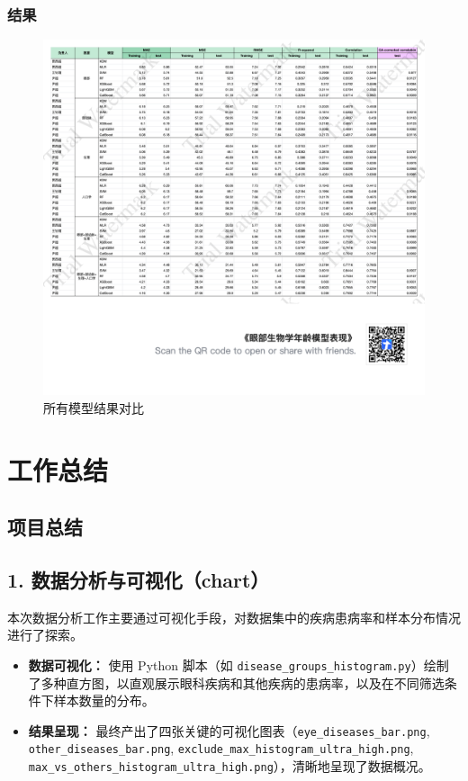 \documentclass[UTF8]{report}
\theoremstyle{MyLineTheoremStyle} %
\theoremstyle{MyBlockTheoremStyle} %
\theoremstyle{MySubsubsectionStyle} %
\begin{document}
\subsection*{结果}
\begin{figure}[H]
    \centering
    \includegraphics[width=1.0\textwidth]{assets/eye_table.png}
    \caption{所有模型结果对比}
    \label{fig:model_comparison}
\end{figure}

\chapter{工作总结}

\section{项目总结}
\section*{1. 数据分析与可视化（chart）}
本次数据分析工作主要通过可视化手段，对数据集中的疾病患病率和样本分布情况进行了探索。

\begin{itemize}
    \item \textbf{数据可视化：} 使用 Python 脚本（如 \texttt{disease\_groups\_histogram.py}）绘制了多种直方图，以直观展示眼科疾病和其他疾病的患病率，以及在不同筛选条件下样本数量的分布。
    \item \textbf{结果呈现：} 最终产出了四张关键的可视化图表（\texttt{eye\_diseases\_bar.png}, \texttt{other\_diseases\_bar.png}, \texttt{exclude\_max\_histogram\_ultra\_high.png}, \texttt{max\_vs\_others\_histogram\_ultra\_high.png}），清晰地呈现了数据概况。
\end{itemize}
\end{document}

